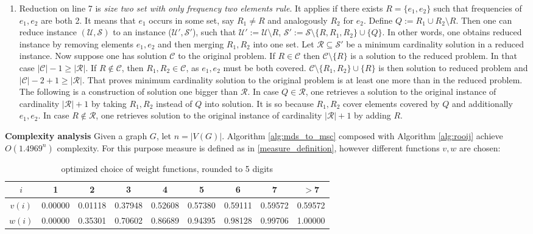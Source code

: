 \begin{enumerate}
    \item Reduction on line 7 is \textit{size two set with only frequency two elements rule}. It applies if there exists $R = \{e_1, e_2\}$ such that frequencies of $e_1, e_2$ are both 2. It means that $e_1$ occurs in some set, say $R_1 \neq R$ and analogously $R_2$ for $e_2$. Define $Q := R_1 \cup R_2 \setminus R$. Then one can reduce instance $(\mathcal{U}, \mathcal{S})$ to an instance ($\mathcal{U'}, \mathcal{S'}$), such that $\mathcal{U'} := \mathcal{U} \setminus R$, $\mathcal{S'} := \mathcal{S}\setminus \{R, R_1, R_2\} \cup \{Q\}$. In other words, one obtains reduced instance by removing elements $e_1, e_2$ and then merging $R_1, R_2$ into one set. Let $\mathcal{R} \subseteq \mathcal{S'}$ be a minimum cardinality solution in a reduced instance. Now suppose one has solution $\mathcal{C}$ to the original problem. If $R \in \mathcal{C}$ then $\mathcal{C} \setminus \{R\}$ is a solution to the reduced problem. In that case $|\mathcal{C}| - 1 \geq |\mathcal{R}|$. If $R \notin \mathcal{C}$, then $R_1, R_2 \in \mathcal{C}$, as $e_1, e_2$ must be both covered. $\mathcal{C} \setminus \{R_1, R_2\} \cup \{R\}$ is then solution to reduced problem and $|\mathcal{C}| - 2 + 1 \geq |\mathcal{R}|$. That proves minimum cardinality solution to the original problem is at least one more than in the reduced problem. The following is a construction of solution one bigger than $\mathcal{R}$. In case $Q \in \mathcal{R}$, one retrieves a solution to the original instance of cardinality $|\mathcal{R}| + 1$ by taking $R_1, R_2$ instead of $Q$ into solution. It is so because $R_1, R_2$ cover elements covered by $Q$ and additionally $e_1, e_2$. In case $R \notin \mathcal{R}$, one retrieves solution to the original instance of cardinality $|\mathcal{R}| + 1$ by adding $R$.

\end{enumerate}

\textbf{Complexity analysis}
Given a graph $G$, let $n = |V(G)|$. Algorithm \ref{alg:mds_to_msc} composed with Algorithm \ref{alg:rooij} achieve $O(1.4969^n)$ complexity. For this purpose measure is defined as in \eqref{measure_definition}, however different functions $v, w$ are chosen:
\begin{table}[ht]
    \centering
    \begin{tabular}{c|c|c|c|c|c|c|c|c}
        $i$ & 1 & 2 & 3 & 4 & 5 & 6 & 7 & $>$7 \\
        \hline
        $v(i)$ & 0.00000 & 0.01118 & 0.37948 & 0.52608 & 0.57380 & 0.59111 & 0.59572 & 0.59572 \\
        \hline
        $w(i)$ & 0.00000 & 0.35301 & 0.70602 & 0.86689 & 0.94395 & 0.98128 & 0.99706 & 1.00000\\
        \hline
    \end{tabular}
    \caption{optimized choice of weight functions, rounded to 5 digits}
\end{table}


